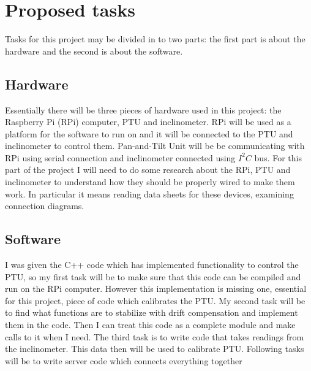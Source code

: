\documentclass[11pt,fleqn,twoside]{article}
\begin{document}
\section{Proposed tasks}

Tasks for this project may be divided in to two parts: the first part is about the hardware and the second is about the software. 

\subsection{Hardware}
Essentially there will be three pieces of hardware used in this project: the Raspberry Pi (RPi) computer, PTU and inclinometer. RPi will be used as a platform for the software to run on and it will be connected to the PTU and inclinometer to control them. Pan-and-Tilt Unit will be be communicating with RPi using serial connection and inclinometer connected using \begin{math}I^2 C\end{math} bus. For this part of the project I will need to do some research about the RPi, PTU and inclinometer to understand how they should be properly wired to make them work. In particular it means reading data sheets for these devices, examining connection diagrams.

\subsection{Software}
I was given the C++ code which has implemented functionality to control the PTU, so my first task will be to make sure that this code can be compiled and run on the RPi computer. However this implementation is missing one, essential for this project, piece of code which calibrates the PTU. My second task will be to find what functions are to stabilize with drift compensation and implement them in the code. Then I can treat this code as a complete module and make calls to it when I need. The third task is to write code that takes readings from the inclinometer. This data then will be used to calibrate PTU. Following tasks will be to write server code which connects everything together      
\end{document}
